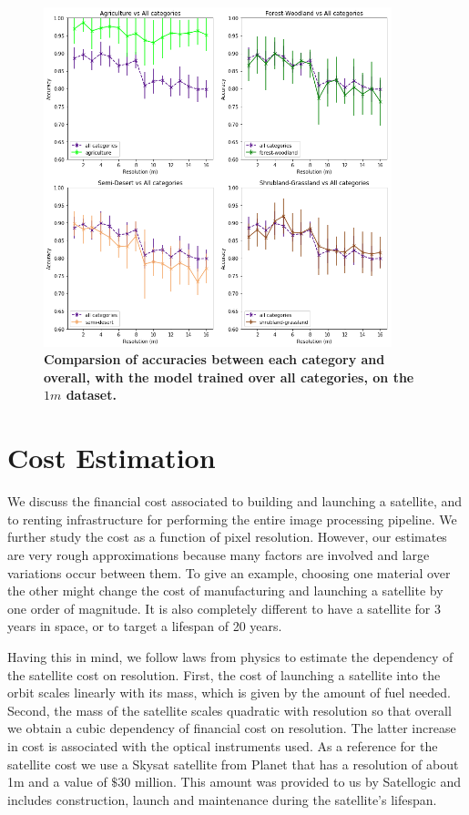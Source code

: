 \begin{figure}[H]
	\centering
	\includegraphics[width=0.9\textwidth]{Figures/results/acc_res_by_category_1m.png}
	\captionsetup{width=1\linewidth}
	\caption{\textbf{Comparsion of accuracies between each category and overall, with the model trained over all categories, on the $1m$ dataset.}}
	\label{fig:acc_by_cat_1m}
\end{figure}


\section{Cost Estimation}

We discuss the financial cost associated to building and launching a satellite, and to renting infrastructure for performing the entire image processing pipeline. We further study the cost as a function of pixel resolution. However, our estimates are very rough approximations because many factors are involved and large variations occur between them. To give an example, choosing one material over the other might change the cost of manufacturing and launching a satellite by one order of magnitude. It is also completely different to have a satellite for 3 years in space, or to target a lifespan of 20 years. 

Having this in mind, we follow laws from physics to estimate the dependency of the satellite cost on resolution. First, the cost of launching a satellite into the orbit scales linearly with its mass, which is given by the amount of fuel needed. Second, the mass of the satellite scales quadratic with resolution so that overall we obtain a cubic dependency of financial cost on resolution. The latter increase in cost is associated with the optical instruments used. As a reference for the satellite cost we use a Skysat satellite from Planet \parencite{skysat_planet} that has a resolution of about 1m and a value of $\$30$ million. This amount was provided to us by Satellogic and includes construction, launch and maintenance during the satellite's lifespan.


